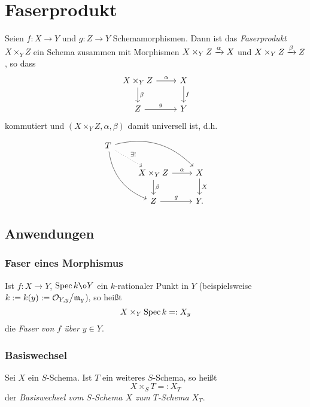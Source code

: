 \section{Faserprodukt} %

\begin{definition}[Faserprodukt]
    Seien $f: X\to Y$ und $g:Z\to Y$ Schemamorphismen.
    Dann ist das \emph{Faserprodukt} $X\times_Y Z$ ein Schema
    zusammen mit Morphismen $X\times_Y Z \xrightarrow\alpha X$ und
    $X\times_Y Z \xrightarrow\beta Z$, so dass
    \[\begin{tikzcd}
        X \times_Y Z \rar{\alpha} \dar{\beta} & X \dar{f}\\
        Z \rar{g} & Y
    \end{tikzcd}\]
    kommutiert und $(X\times_Y Z, \alpha, \beta)$ damit universell ist,
    d.h. 
    \[\begin{tikzcd}
        T \ar[bend left]{drr} \ar[bend right]{ddr} \ar[dotted]{dr}{\exists!}&\\
        &  X \times_Y Z \rar{\alpha} \dar{\beta} & X \dar{X} \\
        & Z \rar{g} & Y.
    \end{tikzcd}\]
\end{definition}

\subsection{Anwendungen}

\subsubsection{Faser eines Morphismus}
\begin{definition}
    \label{def:faser eines morphismus}
    Ist $f:X\to Y$, $\Spec k \o Y$ ein $k$-rationaler Punkt in $Y$ 
    (beispielsweise $k:= k(y) := \mathcal{O}_{Y,y}\big/\mathfrak{m}_y$),
    so heißt
    \[ X \times_Y \operatorname{Spec} k =: X_y\]
    die \emph{Faser von $f$ über $y\in Y$}.
\end{definition}


\subsubsection{Basiswechsel}
\begin{definition}
    \label{def:basiswechsel}
    Sei $X$ ein $S$-Schema. Ist $T$ ein weiteres $S$-Schema, so heißt
    \[X \times_S T =: X_T\]
    der \emph{Basiswechsel vom $S$-Schema $X$ zum $T$-Schema $X_T$}.
\end{definition}

